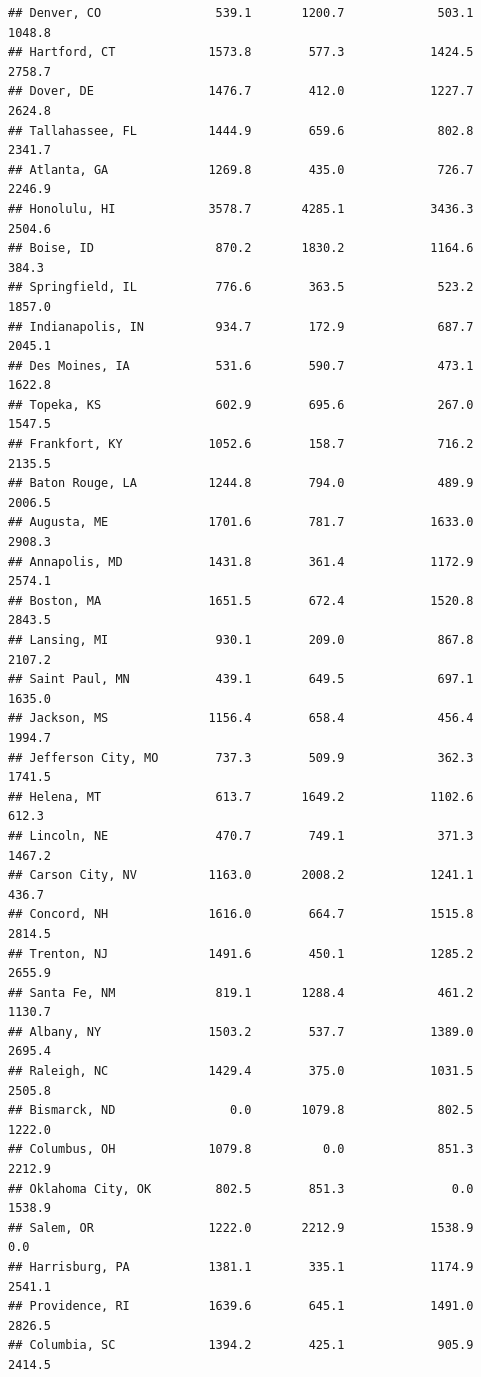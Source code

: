 \documentclass[
]{article}
\begin{document}
\begin{verbatim}
## Denver, CO                539.1       1200.7             503.1    1048.8
## Hartford, CT             1573.8        577.3            1424.5    2758.7
## Dover, DE                1476.7        412.0            1227.7    2624.8
## Tallahassee, FL          1444.9        659.6             802.8    2341.7
## Atlanta, GA              1269.8        435.0             726.7    2246.9
## Honolulu, HI             3578.7       4285.1            3436.3    2504.6
## Boise, ID                 870.2       1830.2            1164.6     384.3
## Springfield, IL           776.6        363.5             523.2    1857.0
## Indianapolis, IN          934.7        172.9             687.7    2045.1
## Des Moines, IA            531.6        590.7             473.1    1622.8
## Topeka, KS                602.9        695.6             267.0    1547.5
## Frankfort, KY            1052.6        158.7             716.2    2135.5
## Baton Rouge, LA          1244.8        794.0             489.9    2006.5
## Augusta, ME              1701.6        781.7            1633.0    2908.3
## Annapolis, MD            1431.8        361.4            1172.9    2574.1
## Boston, MA               1651.5        672.4            1520.8    2843.5
## Lansing, MI               930.1        209.0             867.8    2107.2
## Saint Paul, MN            439.1        649.5             697.1    1635.0
## Jackson, MS              1156.4        658.4             456.4    1994.7
## Jefferson City, MO        737.3        509.9             362.3    1741.5
## Helena, MT                613.7       1649.2            1102.6     612.3
## Lincoln, NE               470.7        749.1             371.3    1467.2
## Carson City, NV          1163.0       2008.2            1241.1     436.7
## Concord, NH              1616.0        664.7            1515.8    2814.5
## Trenton, NJ              1491.6        450.1            1285.2    2655.9
## Santa Fe, NM              819.1       1288.4             461.2    1130.7
## Albany, NY               1503.2        537.7            1389.0    2695.4
## Raleigh, NC              1429.4        375.0            1031.5    2505.8
## Bismarck, ND                0.0       1079.8             802.5    1222.0
## Columbus, OH             1079.8          0.0             851.3    2212.9
## Oklahoma City, OK         802.5        851.3               0.0    1538.9
## Salem, OR                1222.0       2212.9            1538.9       0.0
## Harrisburg, PA           1381.1        335.1            1174.9    2541.1
## Providence, RI           1639.6        645.1            1491.0    2826.5
## Columbia, SC             1394.2        425.1             905.9    2414.5

\end{verbatim}
\end{document}
